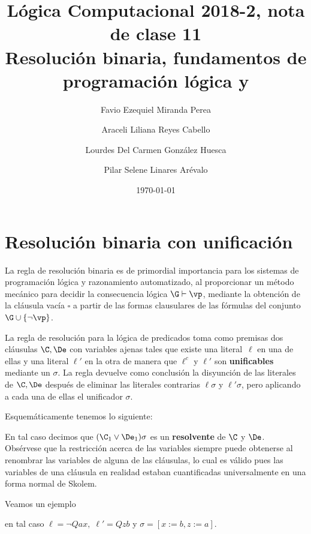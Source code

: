 \documentclass[11pt,letterpaper]{article}
\title{Lógica Computacional 2018-2, nota de clase 11 \\
Resolución binaria, fundamentos de programación lógica y {\pl}
}
\author{Favio Ezequiel Miranda Perea \and Araceli Liliana Reyes Cabello\and
Lourdes Del Carmen Gonz\'alez Huesca \and Pilar Selene Linares Arévalo}
\date{\today}
\begin{document}
\maketitle


\section{Resolución binaria con unificación}

La regla de resolución binaria es de primordial importancia para los sistemas
de programación lógica y razonamiento automatizado, al proporcionar un método
mecánico para decidir la consecuencia lógica $\G\vdash \vp$, mediante la
obtención de la cláusula vacía $\square$ a partir 
de las formas clausulares de las fórmulas del conjunto $\G\cup\{\lnot\vp\}$.


La regla de resolución para la lógica de predicados toma como
premisas dos cláusulas $\C,\De$ con variables ajenas tales que existe una
literal~$\ell$ en una de ellas y una literal $\ell'$ en la otra de manera que 
$\ell^c$ y $\ell'$ son \textbf{unificables} mediante un $\sigma$. 
La regla devuelve como conclusión la disyunción de las literales de $\C,\De$ 
después de eliminar las literales contrarias $\ell\sigma$ y $\ell'\sigma$, pero 
aplicando a cada una de ellas el unificador $\sigma$.

Esquemáticamente tenemos lo siguiente:
\begin{mathpar}
\end{mathpar}
En tal caso decimos que $(\C_1\lor\De_1)\sigma$ es un \textbf{resolvente} de
$\C$ y $\De$.\\
Obsérvese que la restricción acerca de las variables siempre puede obtenerse
al renombrar las variables de alguna de las cláusulas, lo cual es válido pues
las variables de una cláusula en realidad estaban cuantificadas
universalmente en una forma normal de Skolem.


\noindent Veamos un ejemplo
\begin{mathpar}
\end{mathpar}
en tal caso $\ell=\neg Qax,\;\ell'=Qzb$ y $\sigma=[x:=b,z:=a]$.


\medskip
\end{document}
